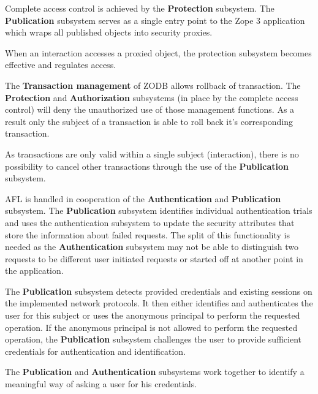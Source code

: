 \documentclass[12pt,english]{scrbook}
\begin{document}

Complete access control is achieved by the \textbf{Protection} subsystem. The
\textbf{Publication} subsystem serves as a single entry point to the Zope 3
application which wraps all published objects into security proxies.

When an interaction accesses a proxied object, the protection subsystem
becomes effective and regulates access.



The \textbf{Transaction management} of ZODB allows rollback of transaction. The
\textbf{Protection} and \textbf{Authorization} subsystems (in place by the
complete access control) will deny the unauthorized use of those management
functions. As a result only the subject of a transaction is able to roll back
it's corresponding transaction.

As transactions are only valid within a single subject (interaction), there is no
possibility to cancel other transactions through the use of the
\textbf{Publication} subsystem.


AFL is handled in cooperation of the \textbf{Authentication} and
\textbf{Publication} subsystem. The \textbf{Publication} subsystem identifies
individual authentication trials and uses the authentication subsystem to
update the security attributes that store the information about failed
requests. The split of this functionality is needed as the
\textbf{Authentication} subsystem may not be able to distinguish two requests
to be different user initiated requests or started off at another point in the
application.
  


The \textbf{Publication} subsystem detects provided credentials and existing
sessions on the implemented network protocols. It then either identifies and
authenticates the user for this subject or uses the anonymous principal to
perform the requested operation. If the anonymous principal is not allowed to
perform the requested operation, the \textbf{Publication} subsystem challenges
the user to provide sufficient credentials for authentication and
identification.

The \textbf{Publication} and \textbf{Authentication} subsystems work together
to identify a meaningful way of asking a user for his credentials. 
\end{document}

